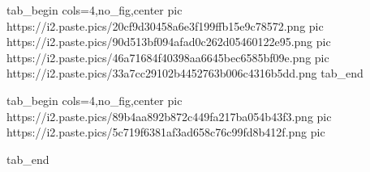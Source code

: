  
 
 
 
 
\zzSecCmtScr

\ifcmt
  tab_begin cols=4,no_fig,center
     pic https://i2.paste.pics/20cf9d30458a6e3f199ffb15e9c78572.png
     pic https://i2.paste.pics/90d513bf094afad0c262d05460122e95.png
     pic https://i2.paste.pics/46a71684f40398aa6645bec6585bf09e.png
     pic https://i2.paste.pics/33a7cc29102b4452763b006c4316b5dd.png
  tab_end
\fi

\ifcmt
  tab_begin cols=4,no_fig,center
     pic https://i2.paste.pics/89b4aa892b872c449fa217ba054b43f3.png
     pic https://i2.paste.pics/5c719f6381af3ad658c76c99fd8b412f.png
     pic 

  tab_end
\fi
